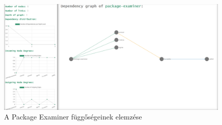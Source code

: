 \begin{figure}[!h]
	\centering
	\includegraphics[scale=0.3]{images/package-examiner.png}
	\caption{A Package Examiner függőségeinek elemzése}
	\label{fig:package-examiner}
\end{figure}